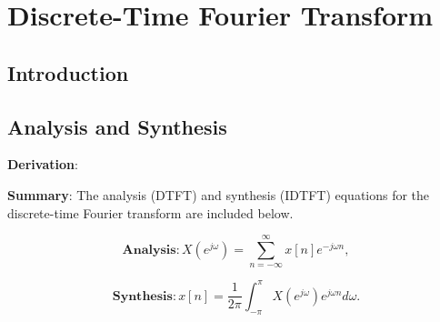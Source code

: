 \chapter{Discrete-Time Fourier Transform}

\section{Introduction}

\section{Analysis and Synthesis}
\textbf{Derivation}:

\textbf{Summary}: The analysis (DTFT) and synthesis (IDTFT) equations for the discrete-time Fourier transform are included below.

\begin{equation}
	\textbf{Analysis}: X(e^{j\omega}) = \sum_{n = -\infty}^{\infty} x[n]e^{-j\omega n},
\end{equation}

\begin{equation}
	\textbf{Synthesis}: x[n] = \frac{1}{2\pi} \int_{-\pi}^{\pi} X(e^{j\omega})e^{j\omega n} d\omega.
\end{equation}

